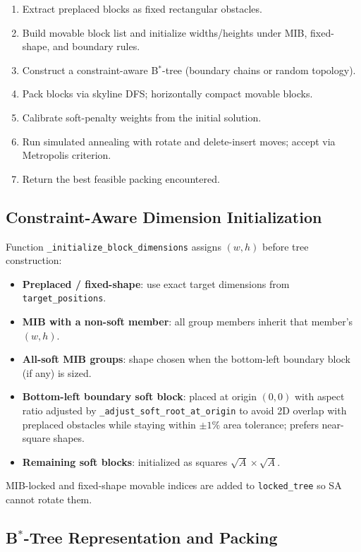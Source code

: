\documentclass[11pt]{article}
\begin{document}
\begin{enumerate}
    \item Extract preplaced blocks as fixed rectangular obstacles.
    \item Build movable block list and initialize widths/heights under MIB, fixed-shape, and boundary rules.
    \item Construct a constraint-aware B$^*$-tree (boundary chains or random topology).
    \item Pack blocks via skyline DFS; horizontally compact movable blocks.
    \item Calibrate soft-penalty weights from the initial solution.
    \item Run simulated annealing with rotate and delete-insert moves; accept via Metropolis criterion.
    \item Return the best feasible packing encountered.
\end{enumerate}

\subsection{Constraint-Aware Dimension Initialization}

Function \texttt{\_initialize\_block\_dimensions} assigns $(w,h)$ before tree construction:
\begin{itemize}
    \item \textbf{Preplaced / fixed-shape}: use exact target dimensions from \texttt{target\_positions}.
    \item \textbf{MIB with a non-soft member}: all group members inherit that member's $(w,h)$.
    \item \textbf{All-soft MIB groups}: shape chosen when the bottom-left boundary block (if any) is sized.
    \item \textbf{Bottom-left boundary soft block}: placed at origin $(0,0)$ with aspect ratio adjusted by \texttt{\_adjust\_soft\_root\_at\_origin} to avoid 2D overlap with preplaced obstacles while staying within $\pm 1\%$ area tolerance; prefers near-square shapes.
    \item \textbf{Remaining soft blocks}: initialized as squares $\sqrt{A} \times \sqrt{A}$.
\end{itemize}
MIB-locked and fixed-shape movable indices are added to \texttt{locked\_tree} so SA cannot rotate them.

\subsection{B$^*$-Tree Representation and Packing}
\end{document}
